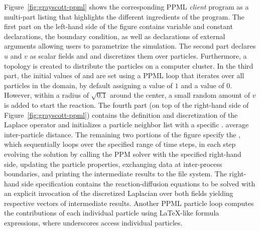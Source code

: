 Figure~\ref{fig:grayscott-ppml} shows the corresponding PPML \emph{client} program as a multi-part listing that highlights the different ingredients of the program. The first part on the left-hand side
of the figure contains variable
and constant declarations, the boundary condition, as well as declarations of external arguments  allowing users to parametrize the simulation. The second part declares $u$
and $v$ as scalar fields  and  and discretizes them over particles. Furthermore, a topology is created to distribute the particles on a computer cluster.
In the third part, the initial values of  and  are set using a PPML  loop that iterates over all particles in the domain, by default assigning  a value
of $1$ and  a value of $0$. However, within a radius of $\sqrt{0.1}$ around the center, a small random amount of $v$ is added to start the reaction.
%
The fourth part (on top of the right-hand side of Figure~\ref{fig:grayscott-ppml}) contains the definition and discretization of the Laplace operator and initializes a particle neighbor list
with a specific .  average inter-particle distance. The remaining two portions of the figure specify the , which
sequentially loops over the specified range of time steps, in each step evolving the solution by calling the PPM solver with the specified right-hand side, updating the
particle properties, exchanging data at inter-process boundaries, and printing the intermediate results to the file system. The right-hand side specification contains the
reaction-diffusion equations to be solved with an explicit invocation of the discretized Laplacian over both fields yielding respective vectors of intermediate results. Another PPML particle
 loop computes the contributions of each individual particle using \LaTeX-like formula expressions, where underscores access individual particles.%
%
